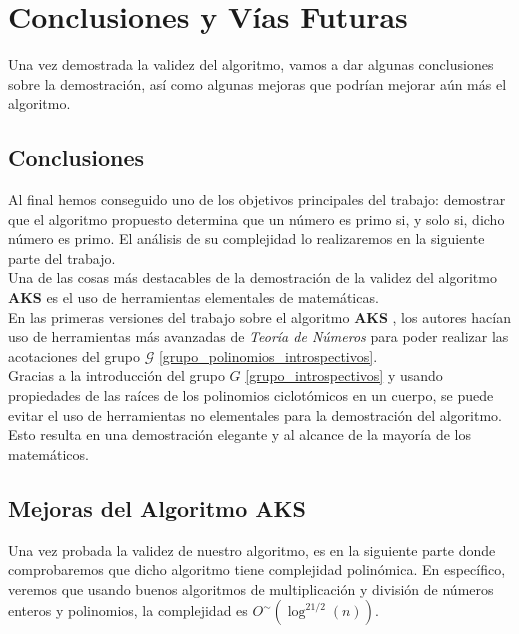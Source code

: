 \chapter{Conclusiones y Vías Futuras}

Una vez demostrada la validez del algoritmo, vamos a dar algunas conclusiones sobre la demostración, así como algunas mejoras que podrían mejorar aún más el algoritmo.

\section{Conclusiones}

Al final hemos conseguido uno de los objetivos principales del trabajo: demostrar que el algoritmo propuesto determina que un número es primo si, y solo si, dicho número es primo. El análisis de su complejidad lo realizaremos en la siguiente parte del trabajo.\\

Una de las cosas más destacables de la demostración de la validez del algoritmo \textbf{AKS} es el uso de herramientas elementales de matemáticas.\\

En las primeras versiones del trabajo sobre el algoritmo \textbf{AKS} \cite{AKS2004}, los autores hacían uso de herramientas más avanzadas de \textit{Teoría de Números} para poder realizar las acotaciones del grupo $\mathcal{G}$ \eqref{grupo_polinomios_introspectivos}.\\

Gracias a la introducción del grupo $G$ \eqref{grupo_introspectivos} y usando propiedades de las raíces de los polinomios ciclotómicos en un cuerpo, se puede evitar el uso de herramientas no elementales para la demostración del algoritmo.\\

Esto resulta en una demostración elegante y al alcance de la mayoría de los matemáticos.

\section{Mejoras del Algoritmo AKS}

Una vez probada la validez de nuestro algoritmo, es en la siguiente parte donde comprobaremos que dicho algoritmo tiene complejidad polinómica. En específico, veremos que usando buenos algoritmos de multiplicación y división de números enteros y polinomios, la complejidad es $O^\sim(\log^{21/2}(n))$.\\

